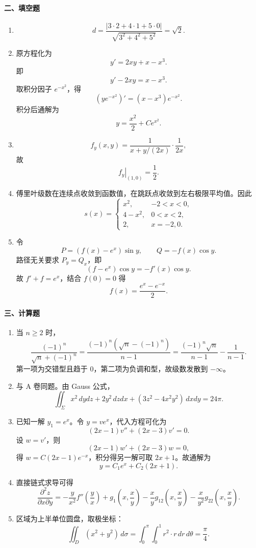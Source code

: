 \paragraph{二、填空题}
\begin{enumerate}
  \item
  \[
  d=\frac{|3\cdot2+4\cdot1+5\cdot0|}{\sqrt{3^2+4^2+5^2}}=\sqrt2.
  \]
  \item 原方程化为
  \[
  y'=2xy+x-x^3.
  \]
  即
  \[
  y'-2xy=x-x^3.
  \]
  取积分因子 $e^{-x^2}$，得
  \[
  (ye^{-x^2})'=(x-x^3)e^{-x^2}.
  \]
  积分后通解为
  \[
  y=\frac{x^2}{2}+Ce^{x^2}.
  \]
  \item
  \[
  f_y(x,y)=\frac{1}{x+y/(2x)}\cdot\frac1{2x},
  \]
  故
  \[
  \left.f_y\right|_{(1,0)}=\frac12.
  \]
  \item 傅里叶级数在连续点收敛到函数值，在跳跃点收敛到左右极限平均值。因此
  \[
  s(x)=
  \begin{cases}
  x^2,&-2<x<0,\\
  4-x^2,&0<x<2,\\
  2,&x=-2,0.
  \end{cases}
  \]
  \item 令
  \[
  P=(f(x)-e^x)\sin y,\qquad Q=-f(x)\cos y.
  \]
  路径无关要求 $P_y=Q_x$，即
  \[
  (f-e^x)\cos y=-f'(x)\cos y.
  \]
  故 $f'+f=e^x$，结合 $f(0)=0$ 得
  \[
  f(x)=\frac{e^x-e^{-x}}2.
  \]
\end{enumerate}

\paragraph{三、计算题}
\begin{enumerate}
  \item 当 $n\ge2$ 时，
  \[
  \frac{(-1)^n}{\sqrt n+(-1)^n}
  =
  \frac{(-1)^n(\sqrt n-(-1)^n)}{n-1}
  =
  \frac{(-1)^n\sqrt n}{n-1}-\frac1{n-1}.
  \]
  第一项为交错型且趋于 $0$，第二项为负调和型，故级数发散到 $-\infty$。
  \item 与 A 卷同题。由 Gauss 公式，
  \[
  \iint_{\Sigma}x^2\,dydz+2y^2\,dzdx+(3z^2-4x^2y^2)\,dxdy=24\pi.
  \]
  \item 已知一解 $y_1=e^x$。令 $y=ve^x$，代入方程可化为
  \[
  (2x-1)v''+(2x-3)v'=0.
  \]
  设 $w=v'$，则
  \[
  (2x-1)w'+(2x-3)w=0,
  \]
  得 $w=C(2x-1)e^{-x}$，积分得另一解可取 $2x+1$。故通解为
  \[
  y=C_1e^x+C_2(2x+1).
  \]
  \item 直接链式求导可得
  \[
  \frac{\partial^2z}{\partial x\partial y}
  =-\frac{y}{x^2}f''\left(\frac yx\right)
  +g_1\left(x,\frac xy\right)
  -\frac{x}{y}g_{12}\left(x,\frac xy\right)
  -\frac{x}{y^2}g_{22}\left(x,\frac xy\right).
  \]
  \item 区域为上半单位圆盘，取极坐标：
  \[
  \iint_D(x^2+y^2)\,d\sigma
  =\int_0^\pi\int_0^1 r^2\cdot r\,dr\,d\theta
  =\frac{\pi}{4}.
  \]
\end{enumerate}

